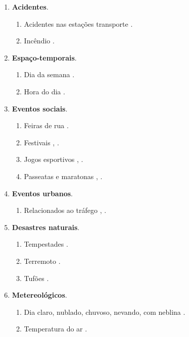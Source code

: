 \documentclass[
	12pt,				%
	oneside,			%
	a4paper,			%
	english,			%
	brazil				%
	]{abntex2ppgsi}
\begin{document}
\begin{enumerate}
\item \textbf{Acidentes}.
\begin{enumerate}
\item Acidentes nas estações transporte \cite{Itoh2016}.
\item Incêndio \cite{Itoh2016}.
\end{enumerate}

\item \textbf{Espaço-temporais}.
\begin{enumerate}
\item Dia da semana \cite{Chen2016}.
\item Hora do dia \cite{Chen2016}.
\end{enumerate}

\item \textbf{Eventos sociais}.
\begin{enumerate}
\item Feiras de rua \cite{Chen2016}.
\item Festivais \cite{Chen2016}, \cite{Lecue2014}.
\item Jogos esportivos \cite{Chen2016}, \cite{Gal-Tzur2014}.
\item Passeatas e maratonas \cite{Chen2016}, \cite{Itoh2016}.
\end{enumerate}

\item \textbf{Eventos urbanos}.
\begin{enumerate}
\item Relacionados ao tráfego \cite{Chen2016}, \cite{Lecue2014}.
\end{enumerate}

\item \textbf{Desastres naturais}.
\begin{enumerate}
\item Tempestades \cite{Itoh2016}.
\item Terremoto \cite{Itoh2016}.
\item Tufões \cite{Itoh2016}.
\end{enumerate}

\item \textbf{Metereológicos}.
\begin{enumerate}
\item Dia claro, nublado, chuvoso, nevando, com neblina \cite{Chen2016}.
\item Temperatura do ar \cite{Chen2016}.
\end{enumerate}

\end{enumerate}
\end{document}
